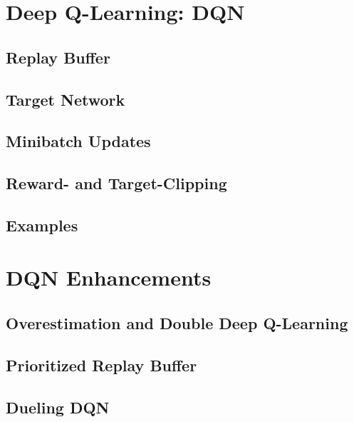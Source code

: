 	\section{Deep Q-Learning: DQN} %

		\subsection{Replay Buffer} %

		\subsection{Target Network} %

		\subsection{Minibatch Updates} %

		\subsection{Reward- and Target-Clipping} %

		\subsection{Examples} %

	\section{DQN Enhancements} %

		\subsection{Overestimation and Double Deep Q-Learning} %

		\subsection{Prioritized Replay Buffer} %

		\subsection{Dueling DQN} %

